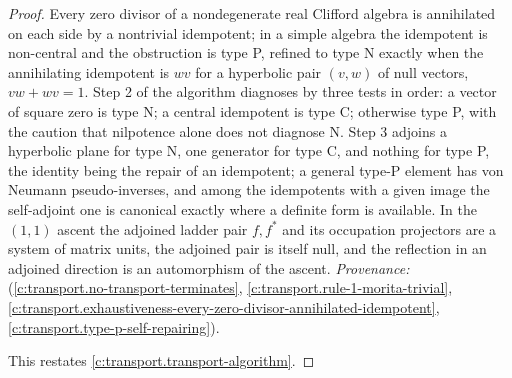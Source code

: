 \documentclass[11pt]{article}
\theoremstyle{definition}
\theoremstyle{plain}
\begin{document}
\begin{proof}
Every zero divisor of a nondegenerate real Clifford algebra is annihilated on each side by a nontrivial idempotent; in a simple algebra the idempotent is non-central and the obstruction is type P, refined to type N exactly when the annihilating idempotent is $wv$ for a hyperbolic pair $(v, w)$ of null vectors, $vw + wv = 1$. Step 2 of the algorithm diagnoses by three tests in order: a vector of square zero is type N; a central idempotent is type C; otherwise type P, with the caution that nilpotence alone does not diagnose N. Step 3 adjoins a hyperbolic plane for type N, one generator for type C, and nothing for type P, the identity being the repair of an idempotent; a general type-P element has von Neumann pseudo-inverses, and among the idempotents with a given image the self-adjoint one is canonical exactly where a definite form is available. In the $(1,1)$ ascent the adjoined ladder pair $f, f^{*}$ and its occupation projectors are a system of matrix units, the adjoined pair is itself null, and the reflection in an adjoined direction is an automorphism of the ascent. \emph{Provenance:} \cite[Def.~3.1, Ex.~3.5, Thm.~3.9, Thm.~4.2, Rem.~5.8, Prop.~6.1, Rem.~6.6, Thm.~7.1, Prop.~7.8, Table~1]{ButlerT1} (\ref{c:transport.no-transport-terminates}, \ref{c:transport.rule-1-morita-trivial}, \ref{c:transport.exhaustiveness-every-zero-divisor-annihilated-idempotent}, \ref{c:transport.type-p-self-repairing}).

This restates \ref{c:transport.transport-algorithm}.

\end{proof}
\end{document}
